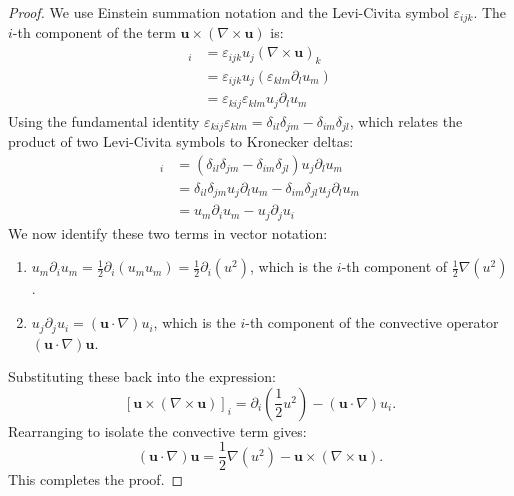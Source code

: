 \begin{solution}
\begin{proof}
We use Einstein summation notation and the Levi-Civita symbol $\varepsilon_{ijk}$. The $i$-th component of the term $\mathbf{u} \times (\nabla \times \mathbf{u})$ is:
\begin{align*}
    [\mathbf{u} \times (\nabla \times \mathbf{u})]_i &= \varepsilon_{ijk} u_j (\nabla \times \mathbf{u})_k \\
    &= \varepsilon_{ijk} u_j (\varepsilon_{klm} \partial_l u_m) \\
    &= \varepsilon_{kij} \varepsilon_{klm} u_j \partial_l u_m
\end{align*}
Using the fundamental identity $\varepsilon_{kij} \varepsilon_{klm} = \delta_{il} \delta_{jm} - \delta_{im} \delta_{jl}$, which relates the product of two Levi-Civita symbols to Kronecker deltas:
\begin{align*}
    [\mathbf{u} \times (\nabla \times \mathbf{u})]_i &= (\delta_{il} \delta_{jm} - \delta_{im} \delta_{jl}) u_j \partial_l u_m \\
    &= \delta_{il} \delta_{jm} u_j \partial_l u_m - \delta_{im} \delta_{jl} u_j \partial_l u_m \\
    &= u_m \partial_i u_m - u_j \partial_j u_i
\end{align*}
We now identify these two terms in vector notation:
\begin{enumerate}
    \item $u_m \partial_i u_m = \frac{1}{2} \partial_i (u_m u_m) = \frac{1}{2} \partial_i (u^2)$, which is the $i$-th component of $\frac{1}{2} \nabla (u^2)$.
    \item $u_j \partial_j u_i = (\mathbf{u} \cdot \nabla) u_i$, which is the $i$-th component of the convective operator $(\mathbf{u} \cdot \nabla) \mathbf{u}$.
\end{enumerate}
Substituting these back into the expression:
\[ [\mathbf{u} \times (\nabla \times \mathbf{u})]_i = \partial_i \left( \frac{1}{2} u^2 \right) - (\mathbf{u} \cdot \nabla) u_i. \]
Rearranging to isolate the convective term gives:
\[ (\mathbf{u} \cdot \nabla) \mathbf{u} = \frac{1}{2} \nabla (u^2) - \mathbf{u} \times (\nabla \times \mathbf{u}). \]
This completes the proof.
\end{proof}


\end{solution}
